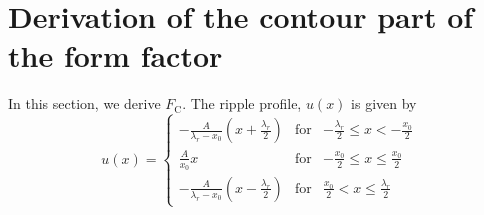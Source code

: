 \documentclass[12pt,letterpaper]{article}
\newcommand{\FC}{F_\mathrm{C}}
\begin{document}
\section{Derivation of the contour part of the form factor}
In this section, we derive $\FC$. The ripple profile, $u(x)$ is given by
\begin{equation}
  u(x) = \left\{
    \begin{array}{ccc}
    -\frac{A}{\lambda_r-x_0}\left(x+\frac{\lambda_r}{2}\right) 
      & \text{for} 
      & -\frac{\lambda_r}{2} \leq x < -\frac{x_0}{2} \\
    \frac{A}{x_0}x 
      & \text{for} 
      & -\frac{x_0}{2} \leq x \leq \frac{x_0}{2} \\
    -\frac{A}{\lambda_r-x_0} \left(x-\frac{\lambda_r}{2}\right)
      & \text{for} 
      & \frac{x_0}{2} < x \leq \frac{\lambda_r}{2}
    \end{array} \right.
\end{equation}
\end{document}
